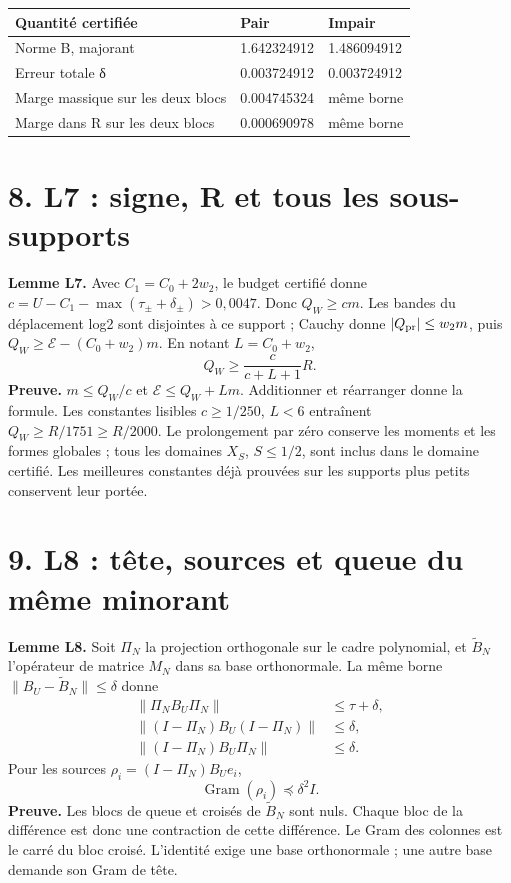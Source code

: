 \documentclass[
  10pt,
  a4paper,
]{article}
\begin{document}
\begin{longtable}[]{@{}lll@{}}
\toprule\noalign{}
Quantité certifiée & Pair & Impair \\
\midrule\noalign{}
\endhead
\bottomrule\noalign{}
\endlastfoot
Norme B, majorant & 1.642324912 & 1.486094912 \\
Erreur totale δ & 0.003724912 & 0.003724912 \\
Marge massique sur les deux blocs & 0.004745324 & même borne \\
Marge dans R sur les deux blocs & 0.000690978 & même borne \\
\end{longtable}

\hypertarget{l7-signe-r-et-tous-les-sous-supports}{%
\section{8. L7 : signe, R et tous les
sous-supports}\label{l7-signe-r-et-tous-les-sous-supports}}

\textbf{Lemme L7.} Avec \(C_1=C_0+2w_2\), le budget certifié donne
\(c=U-C_1-\max(\tau_\pm+\delta_\pm)>0{,}0047\). Donc \(Q_W\ge cm\). Les
bandes du déplacement log2 sont disjointes à ce support ; Cauchy donne
\(|Q_{\rm pr}|\le w_2m\), puis \(Q_W\ge\mathcal E-(C_0+w_2)m\). En
notant \(L=C_0+w_2\), \[
Q_W\ge\frac{c}{c+L+1}R.
\] \textbf{Preuve.} \(m\le Q_W/c\) et \(\mathcal E\le Q_W+Lm\).
Additionner et réarranger donne la formule. Les constantes lisibles
\(c\ge1/250\), \(L<6\) entraînent \(Q_W\ge R/1751\ge R/2000\). Le
prolongement par zéro conserve les moments et les formes globales ; tous
les domaines \(X_S\), \(S\le1/2\), sont inclus dans le domaine certifié.
Les meilleures constantes déjà prouvées sur les supports plus petits
conservent leur portée.

\hypertarget{l8-tuxeate-sources-et-queue-du-muxeame-minorant}{%
\section{9. L8 : tête, sources et queue du même
minorant}\label{l8-tuxeate-sources-et-queue-du-muxeame-minorant}}

\textbf{Lemme L8.} Soit \(\Pi_N\) la projection orthogonale sur le cadre
polynomial, et \(\widetilde B_N\) l'opérateur de matrice \(M_N\) dans sa
base orthonormale. La même borne \(\|B_U-\widetilde B_N\|\le\delta\)
donne \[
\begin{aligned}
\|\Pi_NB_U\Pi_N\|&\le\tau+\delta,\\
\|(I-\Pi_N)B_U(I-\Pi_N)\|&\le\delta,\\
\|(I-\Pi_N)B_U\Pi_N\|&\le\delta.
\end{aligned}
\] Pour les sources \(\rho_i=(I-\Pi_N)B_Ue_i\), \[
\operatorname{Gram}(\rho_i)\preceq\delta^2 I.
\] \textbf{Preuve.} Les blocs de queue et croisés de \(\widetilde B_N\)
sont nuls. Chaque bloc de la différence est donc une contraction de
cette différence. Le Gram des colonnes est le carré du bloc croisé.
L'identité exige une base orthonormale ; une autre base demande son Gram
de tête.
\end{document}
